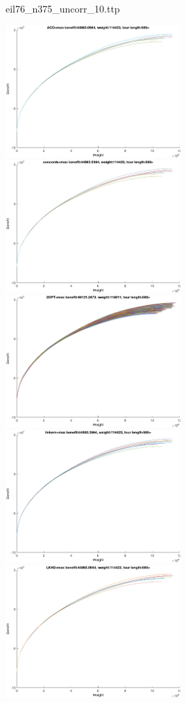 \documentclass{article}
\begin{document}
\newpage
eil76\_n375\_uncorr\_10.ttp

\noindent
\includegraphics[width=0.5\textwidth]{eil76figs/eil76_n375_uncorr_10.ttp.aco.txt.eps}
\includegraphics[width=0.5\textwidth]{eil76figs/eil76_n375_uncorr_10.ttp.con.txt.eps}
\includegraphics[width=0.5\textwidth]{eil76figs/eil76_n375_uncorr_10.ttp.inv.txt.eps}
\includegraphics[width=0.5\textwidth]{eil76figs/eil76_n375_uncorr_10.ttp.lkh.txt.eps}
\includegraphics[width=0.5\textwidth]{eil76figs/eil76_n375_uncorr_10.ttp.lkh2.txt.eps}
\end{document}
